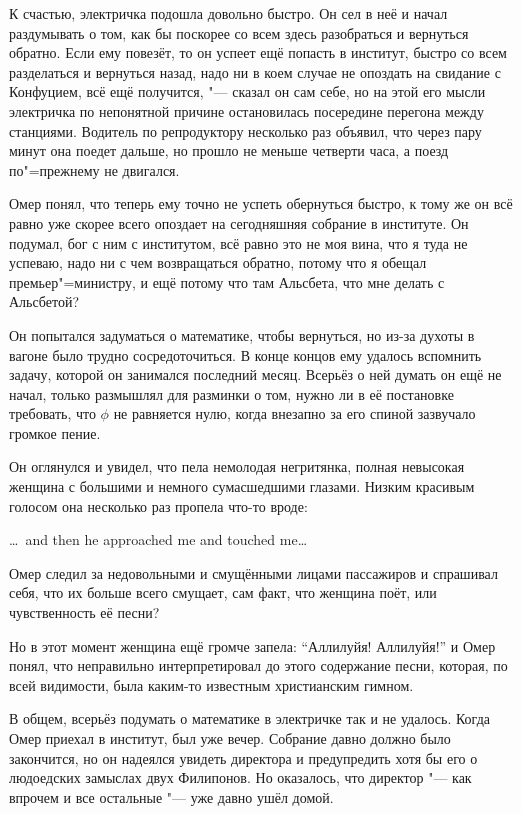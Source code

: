 К счастью, электричка подошла довольно быстро.
Он сел в неё и начал раздумывать о том, как бы поскорее со всем здесь
разобраться и вернуться обратно.
Если ему повезёт, то он успеет ещё попасть в институт, быстро со всем разделаться
и вернуться назад, надо ни в коем случае не опоздать на свидание с Конфуцием,
всё ещё получится, "--- сказал он сам себе, но на этой его мысли электричка по
непонятной причине остановилась посередине перегона между станциями.
Водитель по репродуктору несколько раз объявил, что через пару минут она поедет
дальше, но прошло не меньше четверти часа, а поезд по"=прежнему не двигался.

Омер понял, что теперь ему точно не успеть обернуться быстро, к тому же он всё
равно уже скорее всего опоздает на сегодняшняя собрание в институте.
Он подумал, бог с ним с институтом, всё равно это не моя вина, что я туда не
успеваю, надо ни с чем возвращаться обратно, потому что я обещал
премьер"=министру, и ещё потому что там Альсбета, что мне делать с Альсбетой?

Он попытался задуматься о математике, чтобы вернуться, но из-за духоты в вагоне
было трудно сосредоточиться.
В конце концов ему удалось вспомнить задачу, которой он занимался последний
месяц.
Всерьёз о ней думать он ещё не начал, только размышлял для разминки о том, нужно
ли в её постановке требовать, что $\phi$ не равняется нулю, когда внезапно за
его спиной зазвучало громкое пение.

Он оглянулся и увидел, что пела немолодая негритянка, полная невысокая женщина с
большими и немного сумасшедшими глазами.
Низким красивым голосом она несколько раз пропела что-то вроде:

\foreignlanguage{english}{\ldots\ and then he approached me and touched me\ldots}

Омер следил за недовольными и смущёнными лицами пассажиров и спрашивал себя, что
их больше всего смущает, сам факт, что женщина поёт, или чувственность её песни?

Но в этот момент женщина ещё громче запела: \enquote{Аллилуйя! Аллилуйя!} и Омер
понял, что неправильно интерпретировал до этого содержание песни, которая, по
всей видимости, была каким-то известным христианским гимном.

В общем, всерьёз подумать о математике в электричке так и не удалось.
Когда Омер приехал в институт, был уже вечер.
Собрание давно должно было закончится, но он надеялся увидеть директора и
предупредить хотя бы его о людоедских замыслах двух Филипонов.
Но оказалось, что директор "--- как впрочем и все остальные "--- уже давно ушёл
домой.


